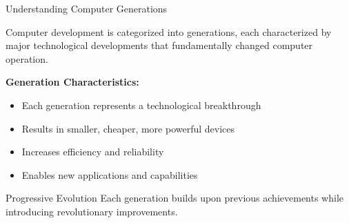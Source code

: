 \documentclass[aspectratio=169]{beamer}
\begin{document}
\begin{frame}{Understanding Computer Generations}
    \begin{definition}
        Computer development is categorized into generations, each characterized by major technological developments that fundamentally changed computer operation.
    \end{definition}
    \textbf{Generation Characteristics:}
    \begin{itemize}
        \item Each generation represents a technological breakthrough
        \item Results in smaller, cheaper, more powerful devices
        \item Increases efficiency and reliability
        \item Enables new applications and capabilities
    \end{itemize}
    \begin{center}
    \end{center}
    
    \begin{exampleblock}{Progressive Evolution}
    \small
        Each generation builds upon previous achievements while introducing revolutionary improvements.
    \end{exampleblock}
\end{frame}
\end{document}
